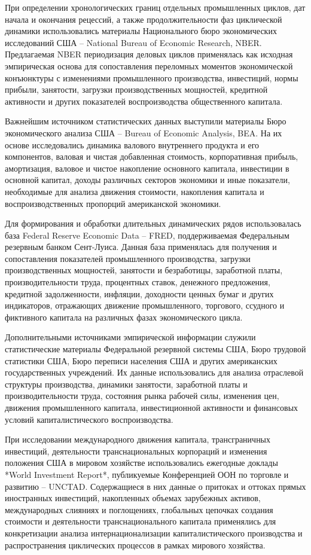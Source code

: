 При определении хронологических границ отдельных промышленных циклов, дат начала и окончания рецессий, а также продолжительности фаз циклической динамики использовались материалы Национального бюро экономических исследований США – National Bureau of Economic Research, NBER. Предлагаемая NBER периодизация деловых циклов применялась как исходная эмпирическая основа для сопоставления переломных моментов экономической конъюнктуры с изменениями промышленного производства, инвестиций, нормы прибыли, занятости, загрузки производственных мощностей, кредитной активности и других показателей воспроизводства общественного капитала.

Важнейшим источником статистических данных выступили материалы Бюро экономического анализа США – Bureau of Economic Analysis, BEA. На их основе исследовались динамика валового внутреннего продукта и его компонентов, валовая и чистая добавленная стоимость, корпоративная прибыль, амортизация, валовое и чистое накопление основного капитала, инвестиции в основной капитал, доходы различных секторов экономики и иные показатели, необходимые для анализа движения стоимости, накопления капитала и воспроизводственных пропорций американской экономики.

Для формирования и обработки длительных динамических рядов использовалась база Federal Reserve Economic Data – FRED, поддерживаемая Федеральным резервным банком Сент-Луиса. Данная база применялась для получения и сопоставления показателей промышленного производства, загрузки производственных мощностей, занятости и безработицы, заработной платы, производительности труда, процентных ставок, денежного предложения, кредитной задолженности, инфляции, доходности ценных бумаг и других индикаторов, отражающих движение промышленного, торгового, ссудного и фиктивного капитала на различных фазах экономического цикла.

Дополнительными источниками эмпирической информации служили статистические материалы Федеральной резервной системы США, Бюро трудовой статистики США, Бюро переписи населения США и других американских государственных учреждений. Их данные использовались для анализа отраслевой структуры производства, динамики занятости, заработной платы и производительности труда, состояния рынка рабочей силы, изменения цен, движения промышленного капитала, инвестиционной активности и финансовых условий капиталистического воспроизводства.

При исследовании международного движения капитала, трансграничных инвестиций, деятельности транснациональных корпораций и изменения положения США в мировом хозяйстве использовались ежегодные доклады *World Investment Report*, публикуемые Конференцией ООН по торговле и развитию – UNCTAD. Содержащиеся в них данные о притоках и оттоках прямых иностранных инвестиций, накопленных объемах зарубежных активов, международных слияниях и поглощениях, глобальных цепочках создания стоимости и деятельности транснационального капитала применялись для конкретизации анализа интернационализации капиталистического производства и распространения циклических процессов в рамках мирового хозяйства.

